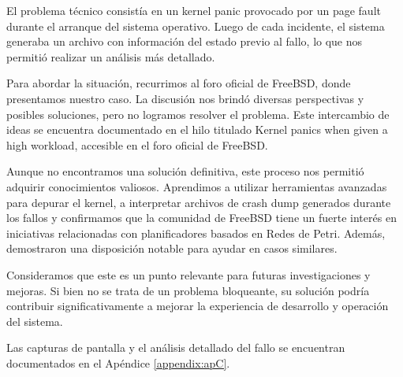 El problema técnico consistía en un kernel panic provocado por un page fault durante el arranque del sistema operativo. Luego de cada incidente, el sistema generaba un archivo con información del estado previo al fallo, lo que nos permitió realizar un análisis más detallado.\par

Para abordar la situación, recurrimos al foro oficial de FreeBSD, donde presentamos nuestro caso. La discusión nos brindó diversas perspectivas y posibles soluciones, pero no logramos resolver el problema. Este intercambio de ideas se encuentra documentado en el hilo titulado Kernel panics when given a high workload, accesible en el foro oficial de FreeBSD\cite{bib6}.\par

Aunque no encontramos una solución definitiva, este proceso nos permitió adquirir conocimientos valiosos. Aprendimos a utilizar herramientas avanzadas para depurar el kernel, a interpretar archivos de crash dump generados durante los fallos y confirmamos que la comunidad de FreeBSD tiene un fuerte interés en iniciativas relacionadas con planificadores basados en Redes de Petri. Además, demostraron una disposición notable para ayudar en casos similares.\par

Consideramos que este es un punto relevante para futuras investigaciones y mejoras. Si bien no se trata de un problema bloqueante, su solución podría contribuir significativamente a mejorar la experiencia de desarrollo y operación del sistema.\par

Las capturas de pantalla y el análisis detallado del fallo se encuentran documentados en el Apéndice \ref{appendix:apC}.\par
